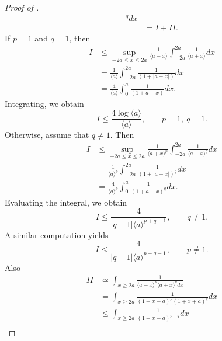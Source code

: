 \documentclass[12pt,reqno]{amsart}
\numberwithin{equation}{section}  %
\renewcommand{\cref}{\Cref}
\begin{document}
\begin{appendices}
\begin{proof}[Proof of \cref{lem:calc}]
\begin{equation*}
\begin{split}
{  ^{q}} d x
  \\
  & = I + II.
\end{split}
\end{equation*}
%
%
If $p=1$ and $q=1$, then 
%
%
\begin{equation*}
\begin{split}
  I
  & \le \sup_{-2a \le x \le 2a} \frac{1}{\langle a - x \rangle
} \int_{-2a}^{2a} \frac{1}{\langle a + x \rangle} d x
  \\
  & = \frac{1}{\langle a \rangle} \int_{-2a}^{2a} \frac{1}{(1 + | a -
  x
  |)} d x
  \\
  & = \frac{4}{\langle a \rangle} \int_{0}^{a} \frac{1}{(1 + a -
  x)} d x.
\end{split}
\end{equation*}
%
%
Integrating, we obtain
%
%
\begin{equation*}
 I
 \le 
 \frac{4 \log \langle a \rangle}{\langle a \rangle}, \qquad p =1, \ q =1.
\end{equation*}
Otherwise, assume that $q \neq 1$. Then
\begin{equation*}
\begin{split}
  I
  & \le \sup_{-2a \le x \le 2a} \frac{1}{\langle a + x \rangle
  ^{p}} \int_{-2a}^{2a} \frac{1}{\langle a - x \rangle ^{q}} d x
  \\
  & = \frac{1}{\langle a \rangle ^{p}} \int_{-2a}^{2a} \frac{1}{(1 + | a -
  x
  |)^{q}} d x
  \\
  & = \frac{4}{\langle a \rangle ^{p}} \int_{0}^{a} \frac{1}{(1 + a -
  x)^{q}} d x.
\end{split}
\end{equation*}
Evaluating the integral, we obtain
\begin{equation*}
  I \le \frac{4}{|q-1| \langle a \rangle ^{p +q -1}}, \qquad q \neq 1.
\end{equation*}
%
%
A similar computation yields
\begin{equation*}
  I \le \frac{4}{|q-1| \langle a \rangle ^{p +q -1}}, \qquad p \neq 1.
\end{equation*}
%
%
Also
%
%
\begin{equation*}
\begin{split}
  II 
  & \simeq \int_{x \ge 2a} \frac{1}{\langle a - x \rangle ^{p} \langle a
  + x \rangle ^{q} d x}
  \\ 
  & = \int_{x \ge 2a} \frac{1}{(1 + x - a)^{p} (1 + x +
  a)^{q}} d x
  \\
  & \le \int_{x \ge 2a} \frac{1}{(1 + x -a)^{p+q}} d x
  \\

\end{split}
\end{equation*}
\end{proof}
\end{appendices}
\end{document}

